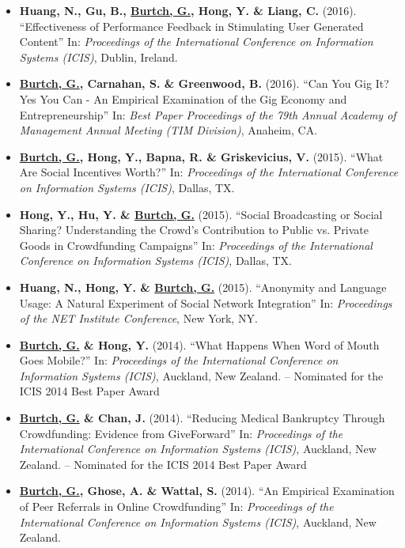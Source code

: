 \documentclass[10.5pt,letterpaper,sans]{moderncv}        %
\begin{document}
\begin{itemize}
\item \textbf{Huang, N., Gu, B., \underline{Burtch, G.}, Hong, Y. \& Liang, C.} (2016). ``Effectiveness of Performance Feedback in Stimulating User Generated Content'' In: \textit{Proceedings of the International Conference on Information Systems (ICIS)}, Dublin, Ireland.

\item \textbf{\underline{Burtch, G.}, Carnahan, S. \& Greenwood, B.} (2016). ``Can You Gig It? Yes You Can - An Empirical Examination of the Gig Economy and Entrepreneurship'' In: \textit{Best Paper Proceedings of the 79th Annual Academy of Management Annual Meeting (TIM Division)}, Anaheim, CA.

\item \textbf{\underline{Burtch, G.}, Hong, Y., Bapna, R. \& Griskevicius, V.} (2015). ``What Are Social Incentives Worth?'' In: \textit{Proceedings of the International Conference on Information Systems (ICIS)}, Dallas, TX.

\item \textbf{Hong, Y., Hu, Y. \& \underline{Burtch, G.}} (2015). ``Social Broadcasting or Social Sharing? Understanding the Crowd's Contribution to Public vs. Private Goods in Crowdfunding Campaigns'' In: \textit{Proceedings of the International Conference on Information Systems (ICIS)}, Dallas, TX.

\item \textbf{Huang, N., Hong, Y. \& \underline{Burtch, G.}} (2015). ``Anonymity and Language Usage: A Natural Experiment of Social Network Integration'' In: \textit{Proceedings of the NET Institute Conference}, New York, NY.

\item \textbf{\underline{Burtch, G.} \& Hong, Y.} (2014). ``What Happens When Word of Mouth Goes Mobile?'' In: \textit{Proceedings of the International Conference on Information Systems (ICIS)}, Auckland, New Zealand. \newline-- Nominated for the ICIS 2014 Best Paper Award

\item \textbf{\underline{Burtch, G.} \& Chan, J.} (2014). ``Reducing Medical Bankruptcy Through Crowdfunding: Evidence from GiveForward'' In: \textit{Proceedings of the International Conference on Information Systems (ICIS)}, Auckland, New Zealand. \newline-- Nominated for the ICIS 2014 Best Paper Award

\item \textbf{\underline{Burtch, G.}, Ghose, A. \& Wattal, S.} (2014). ``An Empirical Examination of Peer Referrals in Online Crowdfunding'' In: \textit{Proceedings of the International Conference on Information Systems (ICIS)}, Auckland, New Zealand.


\end{itemize}
\end{document}
